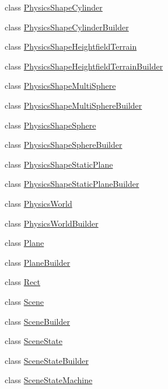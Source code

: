 \begin{DoxyCompactItemize}
\item 
class \mbox{\hyperlink{classnjli_1_1_physics_shape_cylinder}{Physics\+Shape\+Cylinder}}
\item 
class \mbox{\hyperlink{classnjli_1_1_physics_shape_cylinder_builder}{Physics\+Shape\+Cylinder\+Builder}}
\item 
class \mbox{\hyperlink{classnjli_1_1_physics_shape_heightfield_terrain}{Physics\+Shape\+Heightfield\+Terrain}}
\item 
class \mbox{\hyperlink{classnjli_1_1_physics_shape_heightfield_terrain_builder}{Physics\+Shape\+Heightfield\+Terrain\+Builder}}
\item 
class \mbox{\hyperlink{classnjli_1_1_physics_shape_multi_sphere}{Physics\+Shape\+Multi\+Sphere}}
\item 
class \mbox{\hyperlink{classnjli_1_1_physics_shape_multi_sphere_builder}{Physics\+Shape\+Multi\+Sphere\+Builder}}
\item 
class \mbox{\hyperlink{classnjli_1_1_physics_shape_sphere}{Physics\+Shape\+Sphere}}
\item 
class \mbox{\hyperlink{classnjli_1_1_physics_shape_sphere_builder}{Physics\+Shape\+Sphere\+Builder}}
\item 
class \mbox{\hyperlink{classnjli_1_1_physics_shape_static_plane}{Physics\+Shape\+Static\+Plane}}
\item 
class \mbox{\hyperlink{classnjli_1_1_physics_shape_static_plane_builder}{Physics\+Shape\+Static\+Plane\+Builder}}
\item 
class \mbox{\hyperlink{classnjli_1_1_physics_world}{Physics\+World}}
\item 
class \mbox{\hyperlink{classnjli_1_1_physics_world_builder}{Physics\+World\+Builder}}
\item 
class \mbox{\hyperlink{classnjli_1_1_plane}{Plane}}
\item 
class \mbox{\hyperlink{classnjli_1_1_plane_builder}{Plane\+Builder}}
\item 
class \mbox{\hyperlink{classnjli_1_1_rect}{Rect}}
\item 
class \mbox{\hyperlink{classnjli_1_1_scene}{Scene}}
\item 
class \mbox{\hyperlink{classnjli_1_1_scene_builder}{Scene\+Builder}}
\item 
class \mbox{\hyperlink{classnjli_1_1_scene_state}{Scene\+State}}
\item 
class \mbox{\hyperlink{classnjli_1_1_scene_state_builder}{Scene\+State\+Builder}}
\item 
class \mbox{\hyperlink{classnjli_1_1_scene_state_machine}{Scene\+State\+Machine}}

\end{DoxyCompactItemize}
